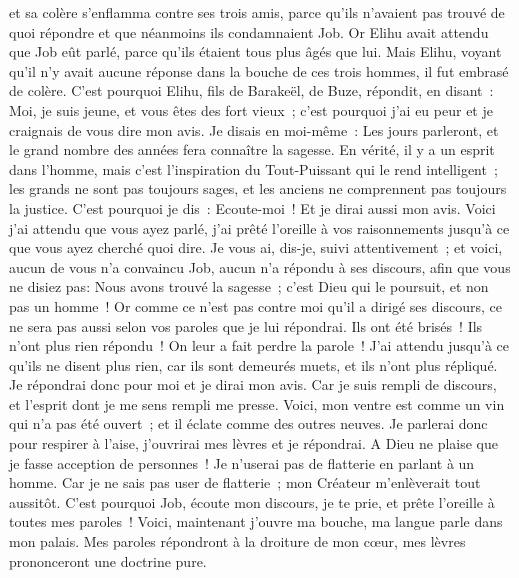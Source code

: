 \begin{multicols}{2}
et sa colère s'enflamma contre ses trois amis, parce qu'ils n'avaient pas trouvé de quoi répondre et que néanmoins ils condamnaient Job. 
Or Elihu avait attendu que Job eût parlé, parce qu'ils étaient tous plus âgés que lui.
Mais Elihu, voyant qu'il n'y avait aucune réponse dans la bouche de ces trois hommes, il fut embrasé de colère.
C'est pourquoi Elihu, fils de Barakeël, de Buze, répondit, en disant~: Moi, je suis jeune, et vous êtes des fort vieux~; c'est pourquoi j'ai eu peur et je craignais de vous dire mon avis. 
Je disais en moi-même~: Les jours parleront, et le grand nombre des années fera connaître la sagesse.
En vérité, il y a un esprit dans l'homme, mais c'est l'inspiration du Tout-Puissant qui le rend intelligent~;
les grands ne sont pas toujours sages, et les anciens ne comprennent pas toujours la justice.
C'est pourquoi je dis~: Ecoute-moi~! Et je dirai aussi mon avis.
Voici j'ai attendu que vous ayez parlé, j'ai prêté l'oreille à vos raisonnements jusqu'à ce que vous ayez cherché quoi dire.
Je vous ai, dis-je, suivi attentivement~; et voici, aucun de vous n'a convaincu Job, aucun n'a répondu à ses discours,
afin que vous ne disiez pas: Nous avons trouvé la sagesse~; c'est Dieu qui le poursuit, et non pas un homme~!
Or comme ce n'est pas contre moi qu'il a dirigé ses discours, ce ne sera pas aussi selon vos paroles que je lui répondrai. 
Ils ont été brisés~! Ils n'ont plus rien répondu~! On leur a fait perdre la parole~!
J'ai attendu jusqu'à ce qu'ils ne disent plus rien, car ils sont demeurés muets, et ils n'ont plus répliqué.
Je répondrai donc pour moi et je dirai mon avis. 
Car je suis rempli de discours, et l'esprit dont je me sens rempli me presse.
Voici, mon ventre est comme un vin qui n'a pas été ouvert~; et il éclate comme des outres neuves.
Je parlerai donc pour respirer à l'aise, j'ouvrirai mes lèvres et je répondrai.
A Dieu ne plaise que je fasse acception de personnes~! Je n'userai pas de flatterie en parlant à un homme.
Car je ne sais pas user de flatterie~; mon Créateur m'enlèverait tout aussitôt.
\VerseOne{}C'est pourquoi Job, écoute mon discours, je te prie, et prête l'oreille à toutes mes paroles~!
Voici, maintenant j'ouvre ma bouche, ma langue parle dans mon palais.
Mes paroles répondront à la droiture de mon cœur, mes lèvres prononceront une doctrine pure.

\end{multicols}
